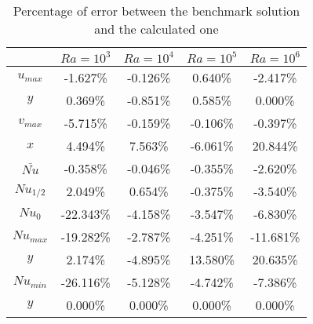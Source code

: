 \begin{table}[h]
	\centering
	\begin{tabular}{c|c|c|c|c|}
		\cline{2-5}
		\multicolumn{1}{l|}{}       & $Ra=10^{3}$ & $Ra=10^{4}$ & $Ra=10^{5}$ & $Ra=10^{6}$ \\ \hline
		\multicolumn{1}{|c|}{$u_{max}$}  & -1.627\%                    & -0.126\%                    & 0.640\%                     & -2.417\%                    \\ \hline
		\multicolumn{1}{|c|}{$y$}     & 0.369\%                     & -0.851\%                    & 0.585\%                     & 0.000\%                     \\ \hline
		\multicolumn{1}{|c|}{$v_{max}$}  & -5.715\%                    & -0.159\%                    & -0.106\%                    & -0.397\%                    \\ \hline
		\multicolumn{1}{|c|}{$x$}     & 4.494\%                     & 7.563\%                     & -6.061\%                    & 20.844\%                    \\ \hline
		\multicolumn{1}{|c|}{$\bar{Nu}$} & -0.358\%                    & -0.046\%                    & -0.355\%                    & -2.620\%                    \\ \hline
		\multicolumn{1}{|c|}{$Nu_{1/2}$}  & 2.049\%                     & 0.654\%                     & -0.375\%                    & -3.540\%                    \\ \hline
		\multicolumn{1}{|c|}{$Nu_{0}$}   & -22.343\%                   & -4.158\%                    & -3.547\%                    & -6.830\%                    \\ \hline
		\multicolumn{1}{|c|}{$Nu_{max}$} & -19.282\%                   & -2.787\%                    & -4.251\%                    & -11.681\%                   \\ \hline
		\multicolumn{1}{|c|}{$y$}     & 2.174\%                     & -4.895\%                    & 13.580\%                    & 20.635\%                    \\ \hline
		\multicolumn{1}{|c|}{$Nu_{min}$} & -26.116\%                   & -5.128\%                    & -4.742\%                    & -7.386\%                    \\ \hline
		\multicolumn{1}{|c|}{$y$}     & 0.000\%                     & 0.000\%                     & 0.000\%                     & 0.000\%                     \\ \hline
	\end{tabular}
	\caption{Percentage of error between the benchmark solution and the calculated one}
\end{table}